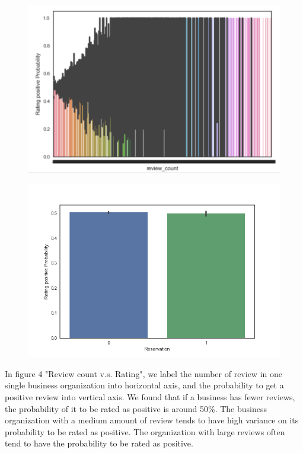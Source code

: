 \documentclass{article}
\begin{document}
\begin{figure}[t]
\centering
\begin{minipage}{.5\textwidth}
  \centering
  \includegraphics[width=\linewidth]{ReviewvR.png}
  \label{fig:test1}
\end{minipage}%
\begin{minipage}{.5\textwidth}
  \centering
  \includegraphics[width=\linewidth]{Reservation}
  \label{fig:test2}
\end{minipage}
\end{figure}

In figure 4 "Review count v.s. Rating", we label the number of review in one single business organization into horizontal axis, and the probability to get a positive review into vertical axis. We found that if a business has fewer reviews, the probability of it to be rated as positive is around 50\%. The business organization with a medium amount of review tends to have high variance on its probability to be rated as positive. The organization with large reviews often tend to have the probability to be rated as positive.
\end{document}
